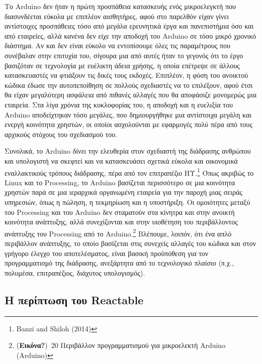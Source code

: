 \documentclass[
]{article}
\begin{document}
Το Arduino δεν ήταν η πρώτη προσπάθεια κατασκευής ενός μικροελεγκτή που
διασυνδέεται εύκολα με επιπλέον αισθητήρες, αφού στο παρελθόν είχαν
γίνει αντίστοιχες προσπάθειες τόσο από μεγάλα ερευνητικά έργα και
πανεπιστήμια όσο και από εταιρείες, αλλά κανένα δεν είχε την αποδοχή του
Arduino σε τόσο μικρό χρονικό διάστημα. Αν και δεν είναι εύκολο να
εντοπίσουμε όλες τις παραμέτρους που συνέβαλαν στην επιτυχία του,
σίγουρα μια από αυτές ήταν το γεγονός ότι το έργο βασιζόταν σε
τεχνολογία με ευέλικτη άδεια χρήσης, η οποία επέτρεψε σε άλλους
κατασκευαστές να φτιάξουν τις δικές τους εκδοχές. Επιπλέον, η φύση του
ανοικτού κώδικα έδωσε την αυτοπεποίθηση σε πολλούς σχεδιαστές να το
επιλέξουν, αφού έτσι θα είχαν μεγαλύτερη ασφάλεια από πιθανές αλλαγές
που θα αποφάσιζε μονομερώς μια εταιρεία. Στα λίγα χρόνια της κυκλοφορίας
του, η αποδοχή και η ευελιξία του Arduino αποδείχτηκαν τόσο μεγάλες, που
δημιουργήθηκε μια αντίστοιχα μεγάλη και ενεργή κοινότητα χρηστών, οι
οποίοι ασχολούνται με εφαρμογές πολύ πέρα από τους αρχικούς στόχους του
σχεδιασμού του.

Συνολικά, το Arduino δίνει την ελευθερία στον σχεδιαστή της διάδρασης
ανθρώπου και υπολογιστή να σκεφτεί και να κατασκευάσει σχετικά εύκολα
και οικονομικά εναλλακτικούς τρόπους διάδρασης, πέρα από τον επιτραπέζιο
ΗΥ.\footnote{Banzi and Shiloh (2014)} Όπως ακριβώς το Linux και το
Processing, το Arduino βασίζεται περισσότερο σε μια κοινότητα χρηστών
παρά σε μια ιεραρχικά οργανωμένη εταιρεία για την παροχή μιας σειράς
υπηρεσιών, όπως η πώληση, η τεκμηρίωση και η υποστήριξη. Οι ομοιότητες
μεταξύ του Processing και του Arduino δεν σταματούν στα κίνητρα και στην
ανοικτή κοινότητα ανάπτυξης, αλλά συνεχίζονται και στην υιοθέτηση του
περιβάλλοντος ανάπτυξης του Processing από το Arduino.\footnote{(\textbf{Εικόνα?})~20
  Περιβάλλον προγραμματισμού για μικροελεκτή Arduino (Arduino)}
Βλέπουμε, λοιπόν, ότι ένα απλό περιβάλλον ανάπτυξης, το οποίο βασίζεται
στις συνεχείς αλλαγές του κώδικα και στον γρήγορο έλεγχο του
αποτελέσματος, είναι βασική προϋπόθεση για τον προγραμματισμό της
διάδρασης, ανεξάρτητα από το τεχνολογικό πλαίσιο (π.χ., πολυμέσα,
επιτραπέζιος, διάχυτος υπολογισμός).

\hypertarget{ux3b7-ux3c0ux3b5ux3c1ux3afux3c0ux3c4ux3c9ux3c3ux3b7-ux3c4ux3bfux3c5-reactable}{%
\subsection{Η περίπτωση του
Reactable}\label{ux3b7-ux3c0ux3b5ux3c1ux3afux3c0ux3c4ux3c9ux3c3ux3b7-ux3c4ux3bfux3c5-reactable}}
\end{document}
